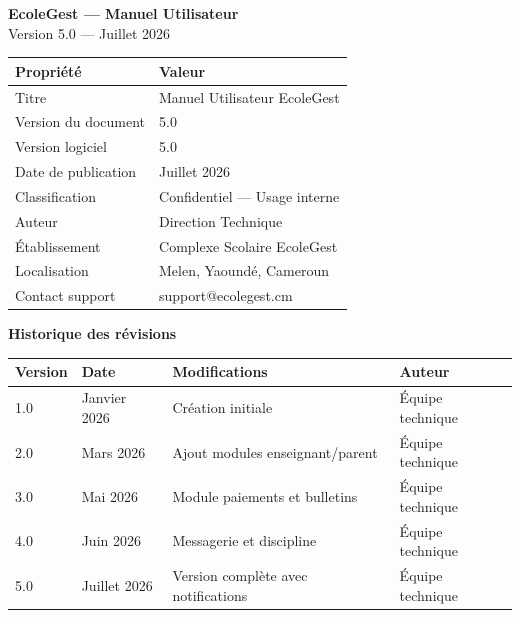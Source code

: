 \documentclass[12pt, a4paper, twoside, openright]{report}
\begin{document}
\thispagestyle{empty}
\vspace*{3cm}
\begin{center}
  {\LARGE\textbf{EcoleGest — Manuel Utilisateur}}\\[10pt]
  {\large Version 5.0 — Juillet 2026}\\[30pt]
  
  \begin{tabularx}{0.75\textwidth}{lX}
    \toprule
    \textbf{Propriété} & \textbf{Valeur} \\
    \midrule
    Titre & Manuel Utilisateur EcoleGest \\
    Version du document & 5.0 \\
    Version logiciel & 5.0 \\
    Date de publication & Juillet 2026 \\
    Classification & Confidentiel — Usage interne \\
    Auteur & Direction Technique \\
    Établissement & Complexe Scolaire EcoleGest \\
    Localisation & Melen, Yaoundé, Cameroun \\
    Contact support & support@ecolegest.cm \\
    \bottomrule
  \end{tabularx}
\end{center}

\vfill

\begin{tcolorbox}[colback=info!5, colframe=info, rounded corners, arc=3mm]
  \small
  \textbf{Historique des révisions}\\[6pt]
  \begin{tabularx}{\textwidth}{llXl}
    \textbf{Version} & \textbf{Date} & \textbf{Modifications} & \textbf{Auteur} \\
    \hline
    1.0 & Janvier 2026 & Création initiale & Équipe technique \\
    2.0 & Mars 2026 & Ajout modules enseignant/parent & Équipe technique \\
    3.0 & Mai 2026 & Module paiements et bulletins & Équipe technique \\
    4.0 & Juin 2026 & Messagerie et discipline & Équipe technique \\
    5.0 & Juillet 2026 & Version complète avec notifications & Équipe technique \\
  \end{tabularx}
\end{tcolorbox}
\end{document}
